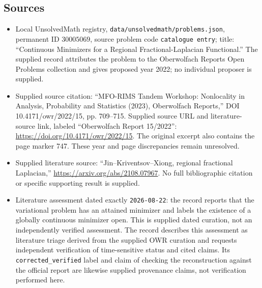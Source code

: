 \documentclass[11pt]{article}
\begin{document}
\subsection{Sources}
\begin{itemize}
\item Local UnsolvedMath registry, \texttt{data/unsolvedmath/problems.json}, permanent ID \(30005069\), source problem code \texttt{catalogue entry}; title: ``Continuous Minimizers for a Regional Fractional-Laplacian Functional.'' The supplied record attributes the problem to the Oberwolfach Reports Open Problems collection and gives proposed year 2022; no individual proposer is supplied.
\item Supplied source citation: ``MFO-RIMS Tandem Workshop: Nonlocality in Analysis, Probability and Statistics (2023), Oberwolfach Reports,'' DOI 10.4171/owr/2022/15, pp. 709--715. Supplied source URL and literature-source link, labeled ``Oberwolfach Report 15/2022'': \url{https://doi.org/10.4171/owr/2022/15}. The original excerpt also contains the page marker 747. These year and page discrepancies remain unresolved.
\item Supplied literature source: ``Jin--Kriventsov--Xiong, regional fractional Laplacian,'' \url{https://arxiv.org/abs/2108.07967}. No full bibliographic citation or specific supporting result is supplied.
\item Literature assessment dated exactly \texttt{2026-08-22}: the record reports that the variational problem has an attained minimizer and labels the existence of a globally continuous minimizer open. This is supplied dated curation, not an independently verified assessment. The record describes this assessment as literature triage derived from the supplied OWR curation and requests independent verification of time-sensitive status and cited claims. Its \texttt{corrected\_verified} label and claim of checking the reconstruction against the official report are likewise supplied provenance claims, not verification performed here.
\end{itemize}
\end{document}
